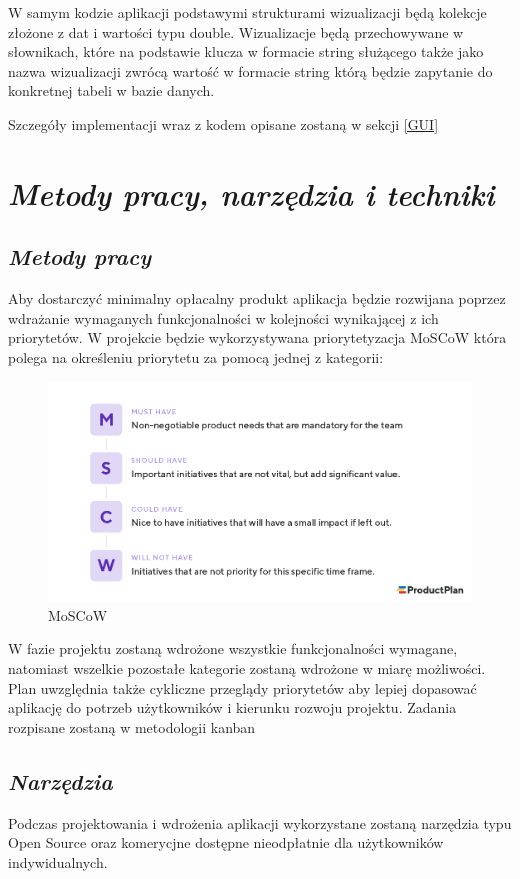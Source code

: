 \documentclass[a4paper,10pt]{report}
\newcommand{\customstylechapter}[1]{\large{\textit{#1}}}
\newcommand{\customstylesection}[1]{\textbf{\textit{#1}}}
\begin{document}
{W samym kodzie aplikacji podstawymi strukturami wizualizacji będą kolekcje 
złożone z dat i wartości typu double. Wizualizacje będą przechowywane w 
słownikach, które na podstawie klucza w formacie string służącego także jako 
nazwa wizualizacji zwrócą wartość w formacie string którą będzie zapytanie do 
konkretnej tabeli w bazie danych.}

{Szczegóły implementacji wraz z kodem opisane zostaną w sekcji \ref{GUI}}


\chapter{\customstylechapter{Metody pracy, narzędzia i techniki}}
\section{\customstylesection{Metody pracy}}
{Aby dostarczyć minimalny opłacalny produkt \cite{MVP} aplikacja będzie 
rozwijana poprzez wdrażanie wymaganych funkcjonalności w kolejności wynikającej 
z ich priorytetów. W projekcie będzie wykorzystywana priorytetyzacja MoSCoW 
\cite{MOSCOW} która polega na określeniu priorytetu za pomocą jednej z kategorii:
\begin{figure}[H]           %
    \caption{MoSCoW}
    \label{fig:MoSCoW}
    \centering  
    \includegraphics[width=12cm]{figures/MoSCoW-01.png}
\end{figure}
W fazie projektu zostaną wdrożone wszystkie funkcjonalności wymagane, natomiast  
wszelkie pozostałe kategorie zostaną wdrożone w miarę możliwości. Plan 
uwzględnia także cykliczne przeglądy priorytetów aby lepiej dopasować aplikację 
do potrzeb użytkowników i kierunku rozwoju projektu. Zadania rozpisane zostaną 
w metodologii kanban}

\section{\customstylesection{Narzędzia}}
{Podczas projektowania i wdrożenia aplikacji wykorzystane zostaną narzędzia typu
 Open Source oraz komerycjne dostępne nieodpłatnie dla użytkowników 
indywidualnych.}
\end{document}
